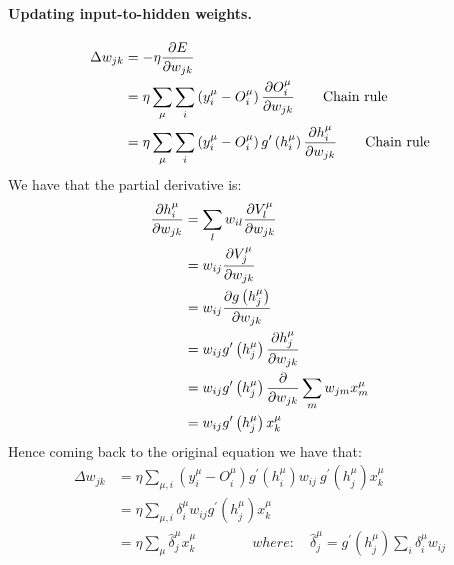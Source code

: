 \paragraph*{Updating input-to-hidden weights.}
\begin{equation} \notag
\begin{split}
\Delta w _ { j k } &= - \eta \frac { \partial E } { \partial w _ { j k } } \\
&= \eta \sum _ { \mu } \sum _ { i } \left( y _ { i } ^ { \mu } - O _ { i } ^ { \mu } \right) \frac { \partial O _ { i } ^ { \mu } } { \partial w _ { j k } } \qquad \text{Chain rule}\\
&= \eta \sum _ { \mu } \sum _ { i } \left( y _ { i } ^ { \mu } - O _ { i } ^ { \mu } \right) g ^ { \prime } \left( h _ { i } ^ { \mu } \right) \frac { \partial h _ { i } ^ { \mu } } { \partial w _ { j k } } \qquad \text{Chain rule}
\end{split}
\end{equation}
We have that the partial derivative is:
\begin{equation} \notag
\begin{split}
\frac { \partial h _ { i } ^ { \mu } } { \partial w _ { j k } } &= \sum _ { l } w_{ i l } \frac { \partial V _ { l } ^ { \mu } } { \partial w_{ j k } }\\
&= w_ { i j } \frac { \partial  V_ { j } ^ { \mu } } { \partial  w _ { j k } }\\
&= w_{ i j } \frac { \partial g \left( h _ { j } ^ { \mu } \right) } { \partial w _ { j k } }\\
&= w_{ i j } g ^ { \prime } \left( h _ { j } ^ { \mu } \right) \frac { \partial h _ { j } ^ { \mu } } { \partial w _ { j k } }\\
&= w_{ i j } g ^ { \prime } \left( h _ { j } ^ { \mu } \right) \frac { \partial } { \partial w _ { j k } } \sum _ { m } w _ { j m } x _ { m } ^ { \mu }\\
&=  w_{ i j } g ^ { \prime } \left( h _ { j } ^ { \mu } \right) x _ { k } ^ { \mu }
\end{split}
\end{equation}
Hence coming back to the original equation we have that:
\begin{equation}
\begin{split}
\Delta w _ { j k } &= \eta \sum _ { \mu , i } \left( y _ { i } ^ { \mu } - O _ { i } ^ { \mu } \right) g ^ { \prime } \left( h _ { i } ^ { \mu } \right) w_ { i j } ~g ^ { \prime } \left( h _ { j } ^ { \mu } \right) x _ { k } ^ { \mu }\\
&= \eta \sum _ { \mu , i } \delta _ { i } ^ { \mu } w_ { i j } g ^ { \prime } \left( h _ { j } ^ { \mu } \right) x _ { k } ^ { \mu }\\
&= \eta \sum _ { \mu } \hat { \delta } _ { j } ^ { \mu } x _ { k } ^ { \mu } \qquad \qquad where: \quad \hat { \delta } _ { j } ^ { \mu } = g ^ { \prime } \left( h _ { j } ^ { \mu } \right) \sum _ { i } \delta _ { i } ^ { \mu } w_ { i j }
\end{split}
\end{equation}
